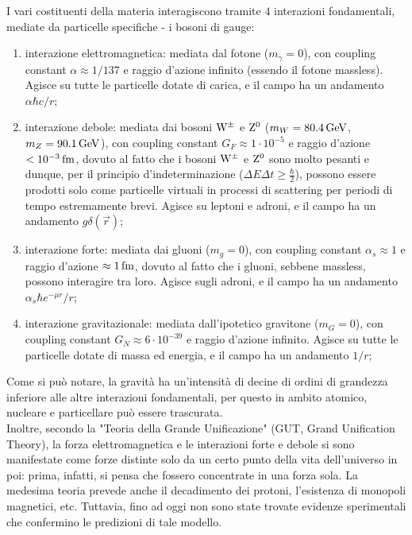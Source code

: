 I vari costituenti della materia interagiscono tramite $ 4 $ interazioni fondamentali, mediate da particelle specifiche - i bosoni di gauge:
\begin{enumerate}
  \item interazione elettromagnetica: mediata dal fotone ($ m_{\gamma} = 0 $), con coupling constant $ \alpha \approx 1/137 $ e raggio d'azione infinito (essendo il fotone massless). Agisce su tutte le particelle dotate di carica, e il campo ha un andamento $\alpha \hbar c / r$;
  \item interazione debole: mediata dai bosoni $ \mathrm{W}^{\pm} $ e $ \mathrm{Z}^0 $ ($ m_W = 80.4\,\mathrm{GeV} $, $ m_Z = 90.1\,\mathrm{GeV} $), con coupling constant $ G_F \approx 1\cdot10^{-5} $ e raggio d'azione $ < 10^{-3}\,\mathrm{fm} $, dovuto al fatto che i bosoni $ \mathrm{W}^{\pm} $ e $ \mathrm{Z}^0 $ sono molto pesanti e dunque, per il principio d'indeterminazione ($ \Delta E \Delta t \ge \frac{\hbar}{2} $), possono essere prodotti solo come particelle virtuali in processi di scattering per periodi di tempo estremamente brevi. Agisce su leptoni e adroni, e il campo ha un andamento $g \delta(\vec{r})$;
  \item interazione forte: mediata dai gluoni ($ m_g = 0 $), con coupling constant $ \alpha_s \approx 1 $ e raggio d'azione $ \approx 1\,\mathrm{fm} $, dovuto al fatto che i gluoni, sebbene massless, possono interagire tra loro. Agisce sugli adroni, e il campo ha un andamento $\alpha_s \hbar e^{-\mu r} / r$;
  \item interazione gravitazionale: mediata dall'ipotetico gravitone ($ m_G = 0 $), con coupling constant $ G_N \approx 6\cdot10^{-39} $ e raggio d'azione infinito. Agisce su tutte le particelle dotate di massa ed energia, e il campo ha un andamento $1 / r$;
\end{enumerate}
Come si può notare, la gravità ha un'intensità di decine di ordini di grandezza inferiore alle altre interazioni fondamentali, per questo in ambito atomico, nucleare e particellare può essere trascurata. \\
Inoltre, secondo la "Teoria della Grande Unificazione" (GUT, Grand Unification Theory), la forza elettromagnetica e le interazioni forte e debole si sono manifestate come forze distinte solo da un certo punto della vita dell'universo in poi: prima, infatti, si pensa che fossero concentrate in una forza sola. La medesima teoria prevede anche il decadimento dei protoni, l'esistenza di monopoli magnetici, etc. Tuttavia, fino ad oggi non sono state trovate evidenze sperimentali che confermino le predizioni di tale modello.

